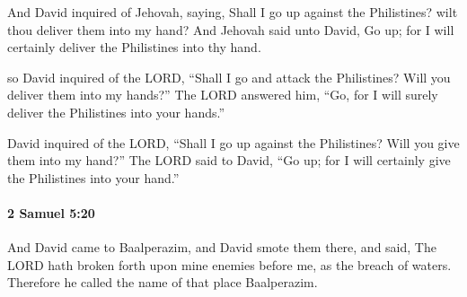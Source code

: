 			\begin{versebox}
					\item[BHS] 
					\item[ASV] And David inquired of Jehovah, saying, Shall I go up against the Philistines? wilt thou deliver them into my hand? And Jehovah said unto David, Go up; for I will certainly deliver the Philistines into thy hand.
					\item[NIV] so David inquired of the LORD, “Shall I go and attack the Philistines? Will you deliver them into my hands?” The LORD answered him, “Go, for I will surely deliver the Philistines into your hands.”
					\item[NRSV] David inquired of the LORD, “Shall I go up against the Philistines? Will you give them into my hand?” The LORD said to David, “Go up; for I will certainly give the Philistines into your hand.”
			\end{versebox}

		\paragraph{2 Samuel 5:20} %
			\label{2SAMUEL-5-20}

			And David came to Baalperazim, and David smote them there, and said, The LORD hath broken forth upon mine enemies before me, as the breach of waters. Therefore he called the name of that place Baalperazim.

